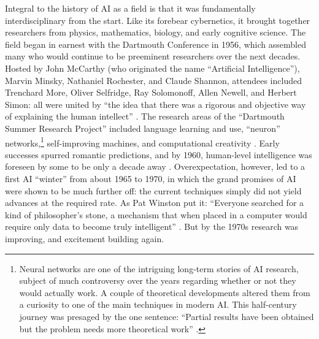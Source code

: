 Integral to the history of AI as a field is that it was fundamentally
interdisciplinary from the start. Like its forebear cybernetics, it
brought together researchers from physics, mathematics, biology, and
early cognitive science. The field began in earnest with the Dartmouth
Conference in 1956, which assembled many who would continue to
be preeminent researchers over the next decades. Hosted by John
McCarthy (who originated the name
``Artificial Intelligence''), Marvin Minsky, Nathaniel Rochester, and
Claude Shannon, attendees included Trenchard More, Oliver Selfridge,
Ray Solomonoff, Allen Newell, and Herbert Simon: all were united by
``the idea that there was a rigorous and objective way of explaining
the human intellect'' \cite[Ch. 5]{mccorduck}. The research areas of
the ``Dartmouth Summer Research Project'' included language learning
and use, ``neuron'' networks,\footnote{Neural networks are one of the
  intriguing long-term stories of AI research, subject of much
  controversy over the years regarding whether or not they would
  actually work. A couple of theoretical developments altered them
  from a curiosity to one of the main techniques in modern AI. This
  half-century journey was presaged by the one sentence: ``Partial
  results have been obtained but the problem needs more theoretical
  work'' \cite{dartmouthconf}.} self-improving machines, and computational 
creativity \cite{dartmouthconf}. Early successes spurred romantic
predictions, and by 1960, human-level intelligence was foreseen by
some to be only a decade away \cite[p. 3]{winston}. Overexpectation, however,
led to a first AI ``winter'' from about 1965 to 1970, in which the
grand promises of AI were shown to be much further off: the current
techniques simply did not yield advances at the required rate. As Pat
Winston put it: ``Everyone searched for a kind of philosopher's stone,
a mechanism that when placed in a computer would require only data to
become truly intelligent'' \cite[p. 4]{winston}. But by the 1970s
research was improving, and excitement building again.


